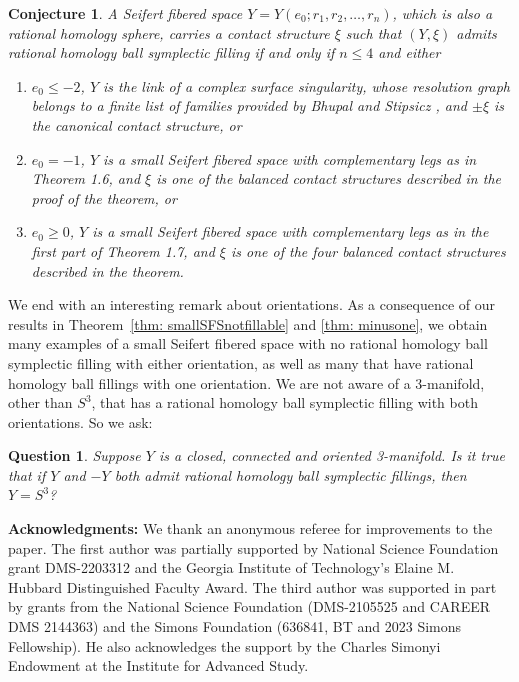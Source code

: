 \documentclass[11pt]{amsart}
\theoremstyle{plain}
\newtheorem{question}[theorem]{Question}
\newtheorem{conjecture}[theorem]{Conjecture}
\theoremstyle{definition}
\theoremstyle{remark}
\numberwithin{theorem}{section}
\begin{document}
\begin{conjecture} A Seifert fibered space $Y=Y(e_0; r_1, r_2,  \ldots, r_n)$, which is also a rational homology sphere,
carries a contact structure $\xi$ such that $(Y, \xi)$ admits rational homology ball symplectic filling if and only if $n \leq 4$ and either
\begin{enumerate} 
\item $e_0 \leq -2$, $Y$ is the link of a complex surface singularity, whose resolution graph belongs to a finite list of families provided by Bhupal and Stipsicz \cite[Figure 1 and Figure 2]{BhupalStipsicz11}, and $\pm \xi$ is the canonical contact structure,  or
\item $e_0 =-1$, $Y$ is a small Seifert fibered space with complementary legs as in Theorem 1.6, and $\xi$ is one of the balanced contact structures described in the proof of the theorem, or 
\item $e_0 \geq 0$, $Y$ is a small Seifert fibered space with complementary legs as in the first part of Theorem 1.7, and $\xi$ is one of the four balanced contact structures described in the theorem. 
\end{enumerate}
\end{conjecture}

We end with an interesting remark about orientations. As a consequence of our results in Theorem~\ref{thm: smallSFSnotfillable} and \ref{thm: minusone}, we obtain many examples of a small Seifert fibered space with no rational homology ball symplectic filling with either orientation, as well as many that have rational homology ball fillings with one orientation. We are not aware of a 3-manifold, other than $S^3$, that has a rational homology ball symplectic filling with both orientations. So we ask:

\begin{question} Suppose $Y$ is a closed, connected and oriented  3-manifold. Is it true that if $Y$ and $-Y$ both admit rational homology ball symplectic fillings, then $Y=S^3$?
\end{question}


\vspace{.2in}
\noindent
{\bf Acknowledgments:} We thank an anonymous referee for improvements to the paper. The first author was partially supported by National Science Foundation grant DMS-2203312 and the Georgia Institute of Technology's Elaine M. Hubbard Distinguished Faculty Award. The third author was supported in part by grants from the National Science Foundation (DMS-2105525 and CAREER DMS 2144363) and the Simons Foundation (636841, BT and 2023 Simons Fellowship). He also acknowledges the support by the Charles Simonyi Endowment at the Institute for Advanced Study.
\end{document}

